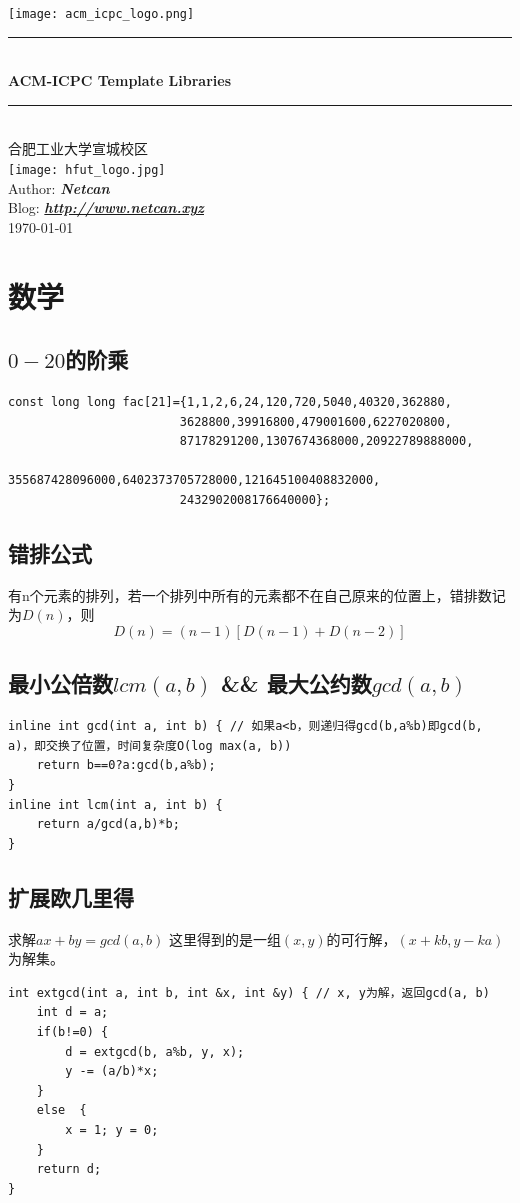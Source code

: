 \documentclass[a4paper]{ctexrep}
\newcommand{\HRule}{\rule{\linewidth}{0.5mm}} %
\begin{document}
\begin{titlepage}
\begin{center}
\texttt{[image: acm\_icpc\_logo.png]}\\[0.5cm]
\HRule\\[0.4cm]
{\huge \bfseries ACM-ICPC Template Libraries}\\[0.2cm]
\HRule\\[1.5cm]
\textsc{\large 合肥工业大学宣城校区}\\[1cm]
\texttt{[image: hfut\_logo.jpg]}\\[0.5cm]
Author: \textbf{\emph{Netcan}}\\
Blog: \textbf{\emph{\url{http://www.netcan.xyz}}}\\
{\large \today}\\[2cm]
\end{center}
\end{titlepage}

\tableofcontents

\chapter{数学}
\section{$0-20$的阶乘}
\begin{lstlisting}
const long long fac[21]={1,1,2,6,24,120,720,5040,40320,362880,
						3628800,39916800,479001600,6227020800,
						87178291200,1307674368000,20922789888000,
						355687428096000,6402373705728000,121645100408832000,
						2432902008176640000};
\end{lstlisting}
\section{错排公式}
有n个元素的排列，若一个排列中所有的元素都不在自己原来的位置上，错排数记为$D(n)$，则
$$D(n) = (n-1)[D(n-1)+D(n-2)]$$
\section{最小公倍数$lcm(a,b)$ \&\& 最大公约数$gcd(a,b)$}
\begin{lstlisting}
inline int gcd(int a, int b) { // 如果a<b，则递归得gcd(b,a%b)即gcd(b, a)，即交换了位置，时间复杂度O(log max(a, b))
	return b==0?a:gcd(b,a%b);
}
inline int lcm(int a, int b) {
	return a/gcd(a,b)*b;
}
\end{lstlisting}
\section{扩展欧几里得}
求解$a x + b y = gcd(a, b)$
这里得到的是一组$(x, y)$的可行解，$(x+k b, y-k a)$为解集。
\begin{lstlisting}
int extgcd(int a, int b, int &x, int &y) { // x, y为解，返回gcd(a, b)
	int d = a;
	if(b!=0) {
		d = extgcd(b, a%b, y, x);
		y -= (a/b)*x;
	}
	else  {
		x = 1; y = 0;
	}
	return d;
}
\end{lstlisting}
\end{document}

